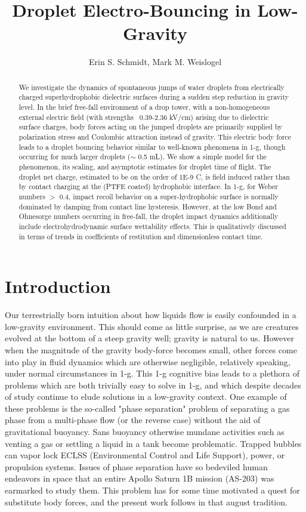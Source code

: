 \documentclass[10pt,a4paper]{article}
\title{\textsf{\textbf{Droplet Electro-Bouncing in Low-Gravity}}}
\author{Erin S. Schmidt, Mark M. Weislogel}
\date{}
\begin{document}
\maketitle
\doublespacing

\begin{abstract}
\noindent
We investigate the dynamics of spontaneous jumps of water droplets from electrically charged superhydrophobic dielectric surfaces during a sudden step reduction in gravity level. In the brief free-fall environment of a drop tower, with a non-homogeneous external electric field (with strengths ~0.39-2.36 kV/cm) arising due to dielectric surface charges, body forces acting on the jumped droplets are primarily supplied by polarization stress and Coulombic attraction instead of gravity. This electric body force leads to a droplet bouncing behavior similar to well-known phenomena in 1-g, though occurring for much larger droplets ($\sim$ 0.5 mL). We show a simple model for the phenomenon, its scaling, and asymptotic estimates for droplet time of flight. The droplet net charge, estimated to be on the order of 1E-9 C, is field induced rather than by contact charging at the (PTFE coated) hydrophobic interface. In 1-g, for Weber numbers $>$ 0.4, impact recoil behavior on a super-hydrophobic surface is normally dominated by damping from contact line hysteresis. However, at the low Bond and Ohnesorge numbers occurring in free-fall, the droplet impact dynamics additionally include electrohydrodynamic surface wettability effects. This is qualitatively discussed in terms of trends in coefficients of restitution and dimensionless contact time.
\end{abstract}

\section{Introduction}
Our terrestrially born intuition about how liquids flow is easily confounded in a low-gravity environment. This should come as little surprise, as we are creatures evolved at the bottom of a steep gravity well; gravity is natural to us. However when the magnitude of the gravity body-force becomes small, other forces come into play in fluid dynamics which are otherwise negligible, relatively speaking, under normal circumstances in 1-g. This 1-g cognitive bias leads to a plethora of problems which are both trivially easy to solve in 1-g, and which despite decades of study continue to elude solutions in a low-gravity context. One example of these problems is the so-called "phase separation" problem of separating a gas phase from a multi-phase flow (or the reverse case) without the aid of gravitational buoyancy. Sans buoyancy otherwise mundane activities such as venting a gas or settling a liquid in a tank become problematic. Trapped bubbles can vapor lock ECLSS (Environmental Control and Life Support), power, or propulsion systems. Issues of phase separation have so bedeviled human endeavors in space that an entire Apollo Saturn 1B mission (AS-203) was earmarked to study them. This problem has for some time motivated a quest for substitute body forces, and the present work follows in that august tradition.
\end{document}
